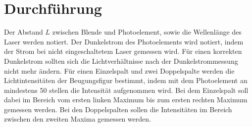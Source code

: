 
\section{Durchführung}
\label{sec:Durchführung}

Der Abstand $L$ zwischen Blende und Photoelement, sowie die Wellenlänge des Laser werden notiert. Der Dunkelstrom des Photoelements wird notiert, indem der Strom bei nicht eingeschaltetem Laser gemessen wird. Für einen korrekten Dunkelstrom sollten sich die Lichtverhältnisse nach der Dunkelstrommessung nicht mehr ändern. Für einen Einzelspalt und zwei Doppelspalte werden die Lichtintensitäten der Beugungsfigur bestimmt, indem mit dem Photoelement an mindestens 50 stellen die Intensität aufgenommen wird. Bei dem Einzelspalt soll dabei im Bereich vom ersten linken Maximum bis zum ersten rechten Maximum gemessen werden. Bei den Doppelspalten sollen die Intensitäten im Bereich zwischen den zweiten Maxima gemessen werden. 